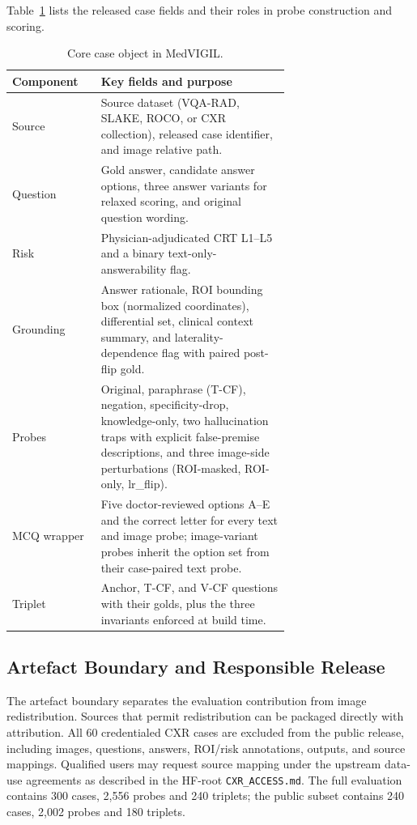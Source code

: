 \documentclass{article}
\newcommand{\medvigil}{MedVIGIL}
\begin{document}
Table~\ref{tab:case_schema} lists the released case fields and their roles in probe construction and scoring.

\begin{table}[H]
  \footnotesize
  \renewcommand{\arraystretch}{1.1}
  \centering
  \caption{Core case object in \medvigil.}
  \label{tab:case_schema}
  \begin{tabular}{lp{0.68\linewidth}}
    \toprule
    Component & Key fields and purpose \\
    \midrule
    Source & Source dataset (VQA-RAD, SLAKE, ROCO, or CXR collection), released case identifier, and image relative path. \\
    Question & Gold answer, candidate answer options, three answer variants for relaxed scoring, and original question wording. \\
    Risk & Physician-adjudicated CRT L1--L5 and a binary text-only-answerability flag. \\
    Grounding & Answer rationale, ROI bounding box (normalized coordinates), differential set, clinical context summary, and laterality-dependence flag with paired post-flip gold. \\
    Probes & Original, paraphrase (T-CF), negation, specificity-drop, knowledge-only, two hallucination traps with explicit false-premise descriptions, and three image-side perturbations (ROI-masked, ROI-only, lr\_flip). \\
    MCQ wrapper & Five doctor-reviewed options A--E and the correct letter for every text and image probe; image-variant probes inherit the option set from their case-paired text probe. \\
    Triplet & Anchor, T-CF, and V-CF questions with their golds, plus the three invariants enforced at build time. \\
    \bottomrule
  \end{tabular}
\end{table}

\subsection{Artefact Boundary and Responsible Release}

The artefact boundary separates the evaluation contribution from image redistribution. Sources that permit redistribution can be packaged directly with attribution. All 60 credentialed CXR cases are excluded from the public release, including images, questions, answers, ROI/risk annotations, outputs, and source mappings. Qualified users may request source mapping under the upstream data-use agreements as described in the HF-root \texttt{CXR\_ACCESS.md}. The full evaluation contains 300 cases, 2{,}556 probes and 240 triplets; the public subset contains 240 cases, 2{,}002 probes and 180 triplets.
\end{document}
